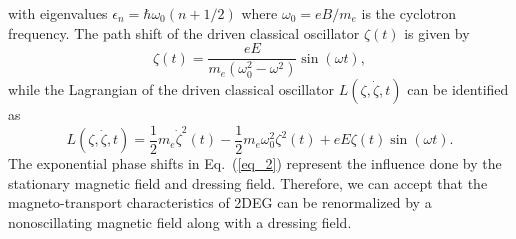 with eigenvalues $\epsilon_n = \hbar \omega_0 (n + 1/2)$ where $\omega_0 = eB/m_e$ is the cyclotron frequency. The path shift of the driven classical oscillator $\zeta(t)$ is given by
\begin{equation} \label{eq_4}
  \zeta(t) = \frac{eE}{m_e(\omega_0^2 - \omega^2)}\sin(\omega t),
\end{equation}
while the Lagrangian of the driven classical oscillator $L(\zeta,\dot{\zeta},t)$ can be identified as
\begin{equation} \label{eq_5}
  L(\zeta,\dot{\zeta},t) = \frac{1}{2} m_e\dot{\zeta}^2(t) - \frac{1}{2}m_e\omega_0^2 \zeta^2(t) + eE\zeta(t) \sin(\omega t).
\end{equation}
The exponential phase shifts in Eq.~(\ref{eq_2}) represent the influence done by the stationary magnetic field and dressing field. Therefore, we can accept that the magneto-transport characteristics of 2DEG can be renormalized by a nonoscillating magnetic field along with a dressing field.
